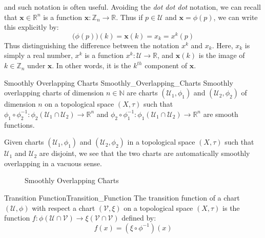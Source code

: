 \documentclass[oneside]{book}                                                  %
\begin{document}
            and such notation is often useful. Avoiding the \textit{dot dot dot}
            notation, we can recall that $\mathbf{x}\in\mathbb{R}^{n}$ is a function
            $\mathbf{x}:\mathbb{Z}_{n}\rightarrow\mathbb{R}$. Thus if $p\in\mathcal{U}$
            and $\mathbf{x}=\phi(p)$, we can write this explicitly by:
            \begin{equation}
                \big(\phi(p)\big)(k)=\mathbf{x}(k)=x_{k}=x^{k}(p)
            \end{equation}
            Thus distinguishing the difference between the notation $x^{k}$ and $x_{k}$.
            Here, $x_{k}$ is simply a real number, $x^{k}$ is a function
            $x^{k}:\mathcal{U}\rightarrow\mathbb{R}$, and $\mathbf{x}(k)$ is the image
            of $k\in\mathbb{Z}_{n}$ under $\mathbf{x}$. In other words, it is the
            $k^{th}$ component of $\mathbf{x}$.
            \begin{fdefinition}{Smoothly Overlapping Charts}
                               {Smoothly_Overlapping_Charts}
                Smoothly overlapping charts of dimension $n\in\mathbb{N}$ are
                charts $(\mathcal{U}_{1},\phi_{1})$ and
                $(\mathcal{U}_{2},\phi_{2})$ of dimension $n$ on a topological
                space $(X,\tau)$ such that
                $\phi_{1}\circ\phi_{2}^{\minus{1}}:%
                 \phi_{2}(\mathcal{U}_{1}\cap\mathcal{U}_{2})%
                 \rightarrow\mathbb{R}^{n}$ and
                $\phi_{2}\circ\phi_{1}^{\minus{1}}:%
                 \phi_{1}(\mathcal{U}_{1}\cap\mathcal{U}_{2})%
                 \rightarrow\mathbb{R}^{n}$ are smooth functions.
            \end{fdefinition}
            Given charts $(\mathcal{U}_{1},\phi_{1})$ and
            $(\mathcal{U}_{2},\phi_{2})$ in a topological space $(X,\tau)$ such
            that $\mathcal{U}_{1}$ and $\mathcal{U}_{2}$ are disjoint, we see that
            the two charts are automatically smoothly overlapping in a
            vacuous sense.
            \begin{figure}[H]
                \centering
                \captionsetup{type=figure}
                
                \caption{Smoothly Overlapping Charts}
                \label{fig:Smoothly_Overlapping_Charts}
            \end{figure}
            \begin{fdefinition}{Transition Function}{Transition_Function}
                The transition function of a chart $(\mathcal{U},\phi)$ with
                respect a chart $(\mathcal{V},\xi)$ on a topological space
                $(X,\tau)$ is the function
                $f:\phi(\mathcal{U}\cap\mathcal{V})%
                 \rightarrow\xi(\mathcal{V}\cap\mathcal{V})$ defined by:
                \begin{equation}
                    f(x)=(\xi\circ\phi^{\minus{1}})(x)
                \end{equation}
            \end{fdefinition}
\end{document}
